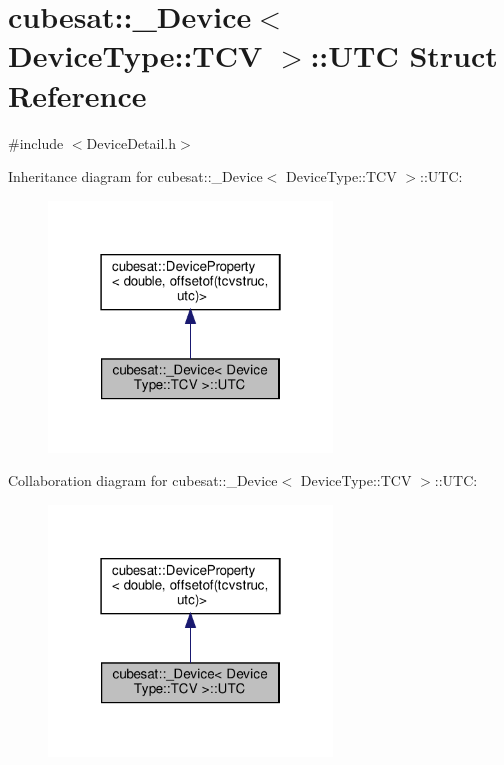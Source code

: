 \hypertarget{structcubesat_1_1__Device_3_01DeviceType_1_1TCV_01_4_1_1UTC}{}\section{cubesat\+:\+:\+\_\+\+Device$<$ Device\+Type\+:\+:T\+CV $>$\+:\+:U\+TC Struct Reference}
\label{structcubesat_1_1__Device_3_01DeviceType_1_1TCV_01_4_1_1UTC}


{\ttfamily \#include $<$Device\+Detail.\+h$>$}



Inheritance diagram for cubesat\+:\+:\+\_\+\+Device$<$ Device\+Type\+:\+:T\+CV $>$\+:\+:U\+TC\+:\nopagebreak
\begin{figure}[H]
\begin{center}
\leavevmode
\includegraphics[width=214pt]{structcubesat_1_1__Device_3_01DeviceType_1_1TCV_01_4_1_1UTC__inherit__graph}
\end{center}
\end{figure}


Collaboration diagram for cubesat\+:\+:\+\_\+\+Device$<$ Device\+Type\+:\+:T\+CV $>$\+:\+:U\+TC\+:\nopagebreak
\begin{figure}[H]
\begin{center}
\leavevmode
\includegraphics[width=214pt]{structcubesat_1_1__Device_3_01DeviceType_1_1TCV_01_4_1_1UTC__coll__graph}
\end{center}
\end{figure}
